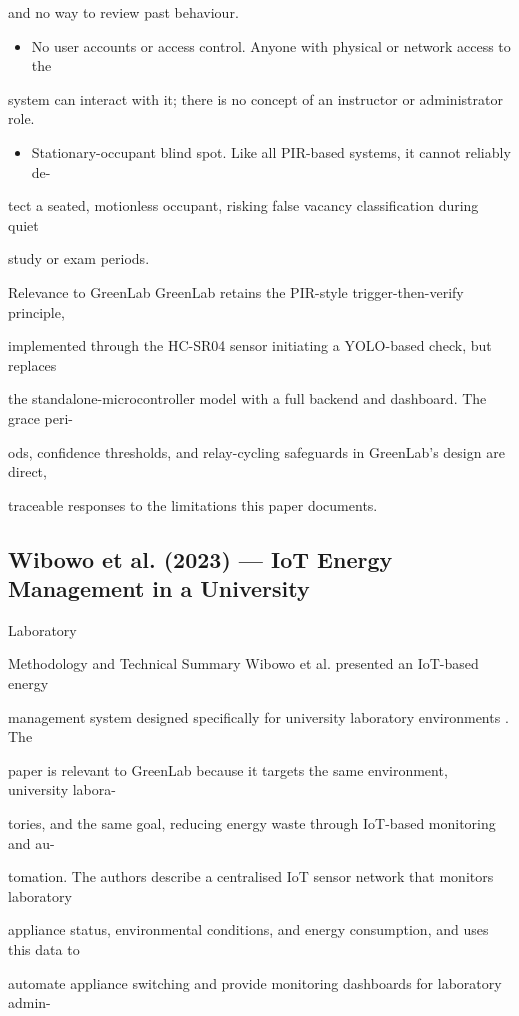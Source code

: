 and no way to review past behaviour.

\begin{itemize}
	\item No user accounts or access control. Anyone with physical or network access to the
\end{itemize}
system can interact with it; there is no concept of an instructor or administrator role.

\begin{itemize}
	\item Stationary-occupant blind spot. Like all PIR-based systems, it cannot reliably de-
\end{itemize}
tect a seated, motionless occupant, risking false vacancy classiﬁcation during quiet

study or exam periods.

Relevance to GreenLab GreenLab retains the PIR-style trigger-then-verify principle,

implemented through the HC-SR04 sensor initiating a YOLO-based check, but replaces

the standalone-microcontroller model with a full backend and dashboard. The grace peri-

ods, conﬁdence thresholds, and relay-cycling safeguards in GreenLab's design are direct,

traceable responses to the limitations this paper documents.


\subsection{Wibowo et al. (2023) --- IoT Energy Management in a University}
Laboratory

Methodology and Technical Summary Wibowo et al. presented an IoT-based energy

management system designed speciﬁcally for university laboratory environments \cite{wibowo2023}. The

paper is relevant to GreenLab because it targets the same environment, university labora-

tories, and the same goal, reducing energy waste through IoT-based monitoring and au-

tomation. The authors describe a centralised IoT sensor network that monitors laboratory

appliance status, environmental conditions, and energy consumption, and uses this data to

automate appliance switching and provide monitoring dashboards for laboratory admin-

